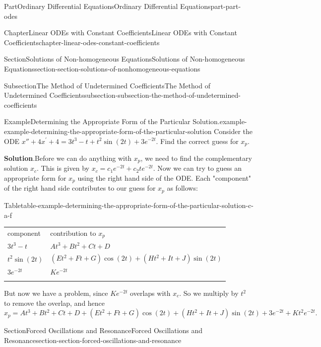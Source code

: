 \documentclass[twoside,10pt,]{book}
\newcommand{\blocktitlefont}{\relax}
\newcommand{\tabularfont}{\relax}
\numberwithin{equation}{part}
\newcommand{\hrulethick} {\noalign{\hrule height 0.11em}}
\begin{document}
\begin{partptx}{Part}{Ordinary Differential Equations}{}{Ordinary Differential Equations}{}{}{part-part-odes}
\begin{chapterptx}{Chapter}{Linear ODEs with Constant Coefficients}{}{Linear ODEs with Constant Coefficients}{}{}{chapter-linear-odes-constant-coefficients}
\begin{sectionptx}{Section}{Solutions of Non-homogeneous Equations}{}{Solutions of Non-homogeneous Equations}{}{}{section-section-solutions-of-nonhomogeneous-equations}
\begin{subsectionptx}{Subsection}{The Method of Undetermined Coefficients}{}{The Method of Undetermined Coefficients}{}{}{subsection-subsection-the-method-of-undetermined-coefficients}
\begin{example}{Example}{Determining the Appropriate Form of the Particular Solution.}{example-example-determining-the-appropriate-form-of-the-particular-solution}%
Consider the ODE \(x'' + 4x^\prime + 4 = 3t^{3} - t + t^{2}\sin(2t) + 3e^{-2t}.\) Find the correct guess for \(x_{p}\).%
\par\smallskip%
\noindent\textbf{\blocktitlefont Solution}.\hypertarget{solution-example-determining-the-appropriate-form-of-the-particular-solution-c}{}\quad{}Before we can do anything with \(x_{p}\), we need to find the complementary solution \(x_{c}\). This is given by \(x_{c} = c_{1}e^{-2t} + c_{2}te^{-2t}.\) Now we can try to guess an appropriate form for \(x_{p}\) using the right hand side of the ODE. Each "component" of the right hand side contributes to our guess for \(x_{p}\) as follows: \begin{tableptx}{Table}{\textbf{}}{table-example-determining-the-appropriate-form-of-the-particular-solution-c-a-f}{}%
\centering%
{\tabularfont%
\begin{tabular}{ll}\hrulethick
component&contribution to \(x_{p}\)\tabularnewline\hrulethick
\(3t^{3} - t\)&\(At^{3} + Bt^{2} + Ct + D\)\tabularnewline\hrulethick
\(t^{2}\sin(2t)\)&\((Et^{2} + Ft + G)\cos(2t) + (Ht^{2} + It + J)\sin(2t)\)\tabularnewline\hrulethick
\(3e^{-2t}\)&\(Ke^{-2t}\)\tabularnewline\hrulethick
\end{tabular}
}%
\end{tableptx}%
 But now we have a problem, since \(Ke^{-2t}\) overlaps with \(x_{c}\). So we multiply by \(t^{2}\) to remove the overlap, and hence \(x_{p} = At^{3} + Bt^{2} + Ct + D + (Et^{2} + Ft + G)\cos(2t) + (Ht^{2} + It + J)\sin(2t) + 3e^{-2t} + Kt^{2}e^{-2t}.\)%
\end{example}
\end{subsectionptx}
\end{sectionptx}
%
%
\typeout{************************************************}
\typeout{************************************************}
%
\begin{sectionptx}{Section}{Forced Oscillations and Resonance}{}{Forced Oscillations and Resonance}{}{}{section-section-forced-oscillations-and-resonance}
\begin{introduction}{}%

\end{introduction}
\end{sectionptx}
\end{chapterptx}
\end{partptx}
\end{document}
